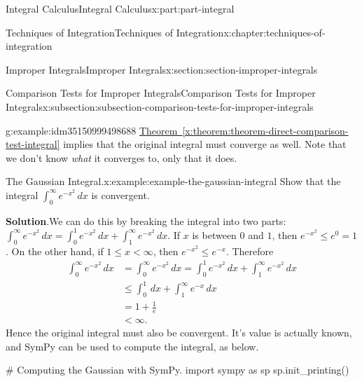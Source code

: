 \documentclass[twoside,10pt,]{tufte-book}
\newcommand{\blocktitlefont}{\relax}
\newcommand{\xreffont}{\relax}
\numberwithin{equation}{part}
\newcommand{\lt}{<}
\begin{document}
\begin{partptx}{Integral Calculus}{}{Integral Calculus}{}{}{x:part:part-integral}
\begin{chapterptx}{Techniques of Integration}{}{Techniques of Integration}{}{}{x:chapter:techniques-of-integration}
\begin{sectionptx}{Improper Integrals}{}{Improper Integrals}{}{}{x:section:section-improper-integrals}
\begin{subsectionptx}{Comparison Tests for Improper Integrals}{}{Comparison Tests for Improper Integrals}{}{}{x:subsection:subsection-comparison-tests-for-improper-integrals}
\begin{example}{}{g:example:idm35150999498688}
\hyperref[x:theorem:theorem-direct-comparison-test-integral]{Theorem~{\xreffont\ref{x:theorem:theorem-direct-comparison-test-integral}}} implies that the original integral must converge as well. Note that we don't know \emph{what} it converges to, only that it does.%
\end{example}
\begin{example}{The Gaussian Integral.}{x:example:example-the-gaussian-integral}%
Show that the integral \(\int_{0}^{\infty}e^{-x^{2}}\,dx\) is convergent.%
\par\smallskip%
\noindent\textbf{\blocktitlefont Solution}.\hypertarget{g:solution:idm35150999494208}{}\quad{}We can do this by breaking the integral into two parts: \(\int_{0}^{\infty}e^{-x^{2}}\,dx = \int_{0}^{1}e^{-x^{2}}\,dx + \int_{1}^{\infty}e^{-x^{2}}\,dx.\) If \(x\) is between \(0\) and \(1\), then \(e^{-x^{2}} \leq e^{0} = 1\). On the other hand, if \(1\leq x\lt \infty\), then \(e^{-x^{2}} \leq e^{-x}\). Therefore%
\begin{align*}
\int_{0}^{\infty}e^{-x^{2}}\,dx & = \int_{0}^{\infty}e^{-x^{2}}\,dx = \int_{0}^{1}e^{-x^{2}}\,dx + \int_{1}^{\infty}e^{-x^{2}}\,dx\\
& \leq \int_{0}^{1}\,dx + \int_{1}^{\infty}e^{-x}\,dx \\
& = 1 + \frac{1}{e} \\
& \lt \infty.
\end{align*}
Hence the original integral must also be convergent. It's value is actually known, and SymPy can be used to compute the integral, as below.%
\end{example}
\begin{sageinput}
# Computing the Gaussian with SymPy.
import sympy as sp
sp.init_printing()


\end{sageinput}
\end{subsectionptx}
\end{sectionptx}
\end{chapterptx}
\end{partptx}
\end{document}

